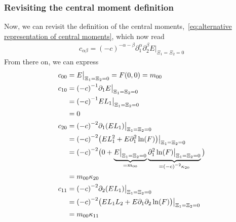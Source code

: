 \documentclass{article}
\begin{document}
\subsubsection{Revisiting the central moment definition}
\label{subs:Revisiting the central moment definition}
Now, we can revisit the definition of the central moments,~\eqref{eq:alternative representation of central moments}, which now read
\begin{equation}
  \begin{aligned}
    c_{\alpha\beta}= {(-c)}^{-\alpha-\beta} \partial_1^\alpha \partial_2^\beta E\bigr|_{\Xi_1=\Xi_2 = 0}
  \end{aligned}
\end{equation}
%
From there on, we can express
\begin{align*}
  \phantom{c_{00}}
  &\begin{aligned}
  \nonumber
    \mathllap{c_{00}} & = E\bigr|_{\Xi_1=\Xi_2 = 0} = F(0,0) = m_{00}
  \end{aligned}\\
  &\begin{aligned}
  \nonumber
    \mathllap{c_{10}} & = {(-c)}^{-1} \partial_1 E  \bigr|_{\Xi_1=\Xi_2 = 0} \\
    & = {(-c)}^{-1} EL_1  \bigr|_{\Xi_1=\Xi_2 = 0} \\
    & = 0
  \end{aligned}\\
  &\begin{aligned}
  \nonumber
    \mathllap{c_{20}} & = {(-c)}^{-2} \partial_1 (EL_1)  \bigr|_{\Xi_1=\Xi_2 = 0} \\
    & = {(-c)}^{-2} \big( EL_1^2 + E \partial_1^2\ln(F)\big)  \bigr|_{\Xi_1=\Xi_2 = 0} \\
    & = {(-c)}^{-2} \big( 0 + \underbrace{E \bigr|_{\Xi_1=\Xi_2 = 0}}_{=m_{00}}
    \underbrace{\partial_1^2\ln(F) \bigr|_{\Xi_1=\Xi_2 = 0}}_{={(-c)}^{-2}\kappa_{20}} \big) \\
    & = m_{00}\kappa_{20}
  \end{aligned}\\
  &\begin{aligned}
  \nonumber
    \mathllap{c_{11}} & = {(-c)}^{-2} \partial_2 (EL_1) \bigr|_{\Xi_1=\Xi_2 = 0} \\
    & = {(-c)}^{-2} \big( E L_1 L_2 + E \partial_1\partial_2\ln(F) \big)  \bigr|_{\Xi_1=\Xi_2 = 0} \\
    & = m_{00}\kappa_{11}
  \end{aligned}\\

\end{align*}
\end{document}
